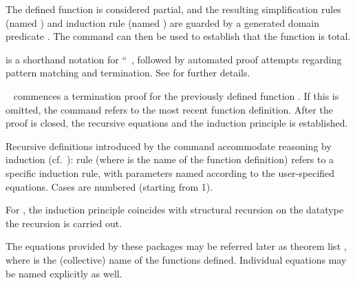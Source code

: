 \begin{isabellebody}
\begin{isamarkuptext}
\begin{description}
  The defined function is considered partial, and the resulting
  simplification rules (named ) and induction rule
  (named ) are guarded by a generated domain
  predicate . The \hyperlink{command.HOL.termination}{\mbox{}}
  command can then be used to establish that the function is total.

  \item \hyperlink{command.HOL.fun}{\mbox{}} is a shorthand notation for ``\hyperlink{command.HOL.function}{\mbox{}}~, followed by automated
  proof attempts regarding pattern matching and termination.  See
  \cite{isabelle-function} for further details.

  \item \hyperlink{command.HOL.termination}{\mbox{}}~ commences a
  termination proof for the previously defined function .  If
  this is omitted, the command refers to the most recent function
  definition.  After the proof is closed, the recursive equations and
  the induction principle is established.

  \end{description}

  Recursive definitions introduced by the \hyperlink{command.HOL.function}{\mbox{}}
  command accommodate
  reasoning by induction (cf.\ ): rule  (where  is the name of the function definition)
  refers to a specific induction rule, with parameters named according
  to the user-specified equations. Cases are numbered (starting from 1).

  For \hyperlink{command.HOL.primrec}{\mbox{}}, the induction principle coincides
  with structural recursion on the datatype the recursion is carried
  out.

  The equations provided by these packages may be referred later as
  theorem list , where  is the (collective)
  name of the functions defined.  Individual equations may be named
  explicitly as well.


\end{isamarkuptext}
\end{isabellebody}
